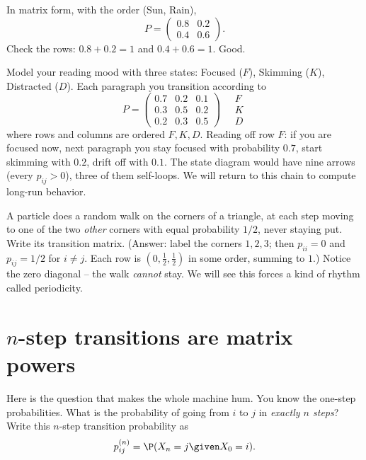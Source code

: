 In matrix form, with the order (Sun, Rain),
\[
  P = \begin{pmatrix} 0.8 & 0.2 \\ 0.4 & 0.6 \end{pmatrix}.
\]
Check the rows: $0.8 + 0.2 = 1$ and $0.4 + 0.6 = 1$. Good.

\begin{example}
\label{ch23:ex-skim}
Model your reading mood with three states: Focused ($F$), Skimming ($K$), Distracted ($D$).
Each paragraph you transition according to
\[
  P = \begin{pmatrix}
   0.7 & 0.2 & 0.1 \\
   0.3 & 0.5 & 0.2 \\
   0.2 & 0.3 & 0.5
  \end{pmatrix}
  \quad
  \begin{array}{l} F \\ K \\ D \end{array}
\]
where rows and columns are ordered $F, K, D$. Reading off row $F$: if you are focused now,
next paragraph you stay focused with probability $0.7$, start skimming with $0.2$, drift off
with $0.1$. The state diagram would have nine arrows (every $p_{ij} > 0$), three of them
self-loops. We will return to this chain to compute long-run behavior.
\end{example}

\begin{walkbox}
A particle does a random walk on the corners of a triangle, at each step moving to one of the
two \emph{other} corners with equal probability $1/2$, never staying put. Write its
transition matrix. (Answer: label the corners $1,2,3$; then $p_{ii}=0$ and
$p_{ij}=1/2$ for $i \ne j$. Each row is $(0,\tfrac12,\tfrac12)$ in some order, summing to
$1$.) Notice the zero diagonal -- the walk \emph{cannot} stay. We will see this forces a kind
of rhythm called periodicity.
\end{walkbox}

\section{$n$-step transitions are matrix powers}
\label{ch23:matrix-powers}

Here is the question that makes the whole machine hum. You know the one-step probabilities.
What is the probability of going from $i$ to $j$ in \emph{exactly $n$ steps}? Write this
$n$-step transition probability as
\[
  p_{ij}^{(n)} = \P(X_n = j \given X_0 = i).
\]

